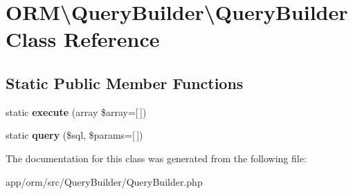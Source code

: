 \hypertarget{classORM_1_1QueryBuilder_1_1QueryBuilder}{}\section{O\+RM\textbackslash{}Query\+Builder\textbackslash{}Query\+Builder Class Reference}
\label{classORM_1_1QueryBuilder_1_1QueryBuilder}
\subsection*{Static Public Member Functions}
\begin{DoxyCompactItemize}
\item 
static {\bfseries execute} (array \$array=\mbox{[}$\,$\mbox{]})\hypertarget{classORM_1_1QueryBuilder_1_1QueryBuilder_a04b38cded552e8b70c48f0e54c6d56ca}{}\label{classORM_1_1QueryBuilder_1_1QueryBuilder_a04b38cded552e8b70c48f0e54c6d56ca}

\item 
static {\bfseries query} (\$sql, \$params=\mbox{[}$\,$\mbox{]})\hypertarget{classORM_1_1QueryBuilder_1_1QueryBuilder_aa61da745454f5038bb6f7786673ef2b8}{}\label{classORM_1_1QueryBuilder_1_1QueryBuilder_aa61da745454f5038bb6f7786673ef2b8}

\end{DoxyCompactItemize}


The documentation for this class was generated from the following file\+:\begin{DoxyCompactItemize}
\item 
app/orm/src/\+Query\+Builder/Query\+Builder.\+php\end{DoxyCompactItemize}
